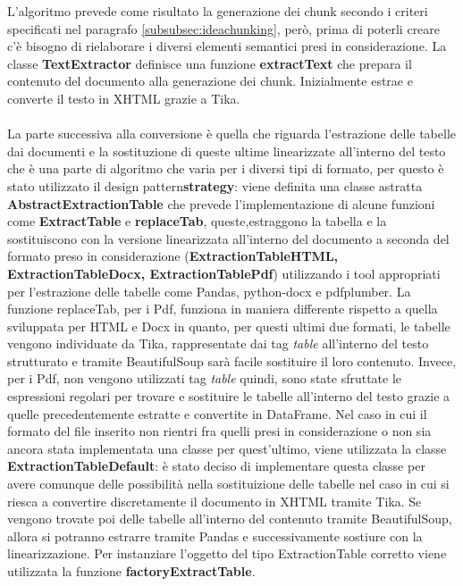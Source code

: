 \noindent L'algoritmo prevede come risultato la generazione dei chunk secondo i criteri specificati nel paragrafo \ref{subsubsec:ideachunking}, però, prima di poterli creare c'è bisogno di rielaborare i diversi elementi semantici presi in considerazione.
La classe \textbf{TextExtractor} definisce una funzione \textbf{extractText} che prepara il contenuto del documento alla generazione dei chunk. Inizialmente estrae e converte il testo in XHTML grazie a Tika.
\\\\La parte successiva alla conversione è quella che riguarda l'estrazione delle tabelle dai documenti e la sostituzione di queste ultime linearizzate all'interno del testo che è una parte di algoritmo che varia per i diversi tipi di formato, per questo è stato utilizzato 
il \gls{design pattern}\glsfirstoccur \textbf{\gls{strategy}}\glsfirstoccur: viene definita una classe astratta \textbf{AbstractExtractionTable} che prevede l'implementazione di alcune funzioni come \textbf{ExtractTable} e \textbf{replaceTab}, queste,estraggono la tabella e la sostituiscono con la versione linearizzata all'interno del documento
a seconda del formato preso in considerazione (\textbf{ExtractionTableHTML, ExtractionTableDocx, ExtractionTablePdf}) utilizzando i tool appropriati per l'estrazione delle tabelle come Pandas, python-docx e pdfplumber.
La funzione replaceTab, per i Pdf, funziona in maniera differente rispetto a quella sviluppata per HTML e Docx in quanto, per questi ultimi due formati, le tabelle vengono individuate da Tika, rappresentate dai tag \emph{table} all'interno del testo strutturato e tramite BeautifulSoup sarà facile sostituire il loro contenuto.
Invece, per i Pdf, non vengono utilizzati tag \emph{table} quindi, sono state sfruttate le espressioni regolari per trovare e sostituire le tabelle all'interno del testo grazie a quelle precedentemente estratte e convertite in DataFrame.
Nel caso in cui il formato del file inserito non rientri fra quelli presi in considerazione o non sia ancora stata implementata una classe per quest'ultimo, viene utilizzata la classe \textbf{ExtractionTableDefault}: è stato deciso di implementare questa classe per avere comunque delle possibilità nella sostituizione delle tabelle nel caso in cui si riesca a convertire discretamente il documento in XHTML tramite Tika.
Se vengono trovate poi delle tabelle all'interno del contenuto tramite BeautifulSoup, allora si potranno estrarre tramite Pandas e successivamente sostiure con la linearizzazione.
Per instanziare l'oggetto del tipo ExtractionTable corretto viene utilizzata la funzione \textbf{factoryExtractTable}. 
